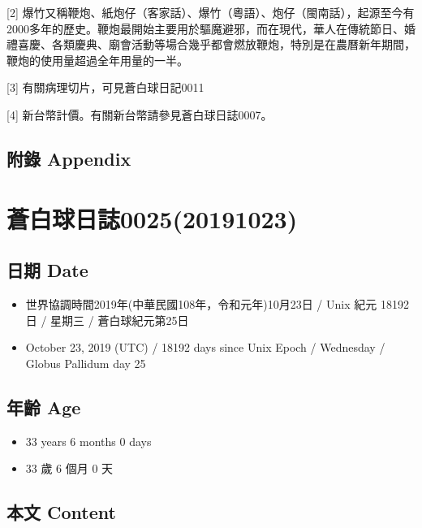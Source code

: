 \documentclass[a5paper, 12pt
]{book}
\providecommand{\tightlist}{%
  \setlength{\itemsep}{0pt}\setlength{\parskip}{0pt}}
\begin{document}
{[}2{]}
爆竹又稱鞭炮、紙炮仔（客家話）、爆竹（粵語）、炮仔（閩南話），起源至今有2000多年的歷史。鞭炮最開始主要用於驅魔避邪，而在現代，華人在傳統節日、婚禮喜慶、各類慶典、廟會活動等場合幾乎都會燃放鞭炮，特別是在農曆新年期間，鞭炮的使用量超過全年用量的一半。

{[}3{]} 有關病理切片，可見蒼白球日記0011

{[}4{]} 新台幣計價。有關新台幣請參見蒼白球日誌0007。

\hypertarget{ux9644ux9304-appendix-16}{%
\subsection{附錄 Appendix}\label{ux9644ux9304-appendix-16}}

\hypertarget{ux84bcux767dux7403ux65e5ux8a8c002520191023}{%
\section{蒼白球日誌0025(20191023)}\label{ux84bcux767dux7403ux65e5ux8a8c002520191023}}

\hypertarget{ux65e5ux671f-date-24}{%
\subsection{日期 Date}\label{ux65e5ux671f-date-24}}

\begin{itemize}
\tightlist
\item
  世界協調時間2019年(中華民國108年，令和元年)10月23日 / Unix 紀元 18192
  日 / 星期三 / 蒼白球紀元第25日
\item
  October 23, 2019 (UTC) / 18192 days since Unix Epoch / Wednesday /
  Globus Pallidum day 25
\end{itemize}

\hypertarget{ux5e74ux9f61-age-24}{%
\subsection{年齡 Age}\label{ux5e74ux9f61-age-24}}

\begin{itemize}
\tightlist
\item
  33 years 6 months 0 days
\item
  33 歲 6 個月 0 天
\end{itemize}

\hypertarget{ux672cux6587-content-24}{%
\subsection{本文 Content}\label{ux672cux6587-content-24}}
\end{document}
